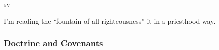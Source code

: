 \begin{compactdesc}
sv			\item[{\hyperref[3NEPHI-18-5]{3 Nephi 18:5}}]
			\item[{\hyperref[3NEPHI-20-22]{3 Nephi 20:22}}]
			\item[{\hyperref[3NEPHI-21-25]{3 Nephi 21:25}}]
			\item[{\hyperref[3NEPHI-28-10]{3 Nephi 28:20}}]
			\item[{\hyperref[3NEPHI-28-39]{3 Nephi 28:39}}]
			\item[{\hyperref[MORMON-8-24]{Mormon 8:24}}]
			\item[{\hyperref[MORMON-9-13]{Mormon 9:13}}]
			\item[{\hyperref[MORMON-9-17]{Mormon 9:17}}]
			\item[{\hyperref[ETHER-3-14]{Ether 3:14}}]
			\item[{\hyperref[ETHER-12-10]{Ether 12:10}}]
			\item[{\hyperref[ETHER-12-28]{Ether 12:28}}] \phantom{.}
				\begin{compactitem}
					\item I'm reading the ``fountain of all righteousness'' it in a priesthood way.
				\end{compactitem}
			\item[{\hyperref[MORONI-2-2]{Moroni 2:2--3}}]
			\item[{\hyperref[MORONI-3-2]{Moroni 3:2--4}}]
			\item[{\hyperref[MORONI-7-27]{Moroni 7:27}}]
		\end{compactdesc}
		
	\subsubsection{Doctrine and Covenants} %
		\label{PRIESTHOOD-DC}
	
		
